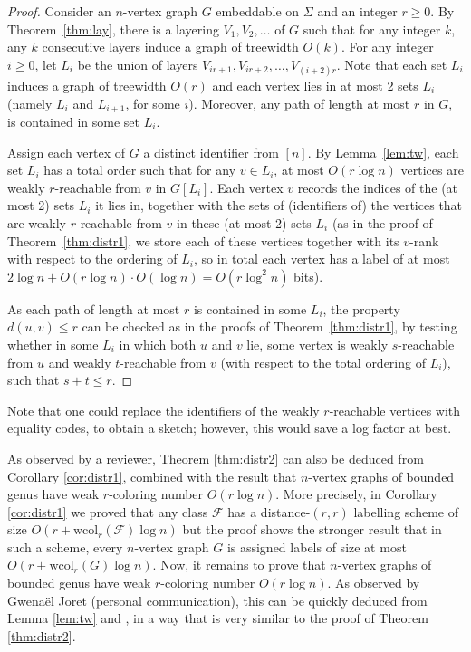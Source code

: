 \documentclass[11pt]{article}
\theoremstyle{definition}
\newcommand{\wcol}{\mathrm{wcol}}
\renewcommand{\le}{\leqslant}
\renewcommand{\ge}{\geqslant}
\begin{document}
\begin{proof}
Consider an $n$-vertex graph $G$ embeddable on $\Sigma$ and an integer
$r\ge0$. By Theorem~\ref{thm:lay}, there is a layering  $V_1, V_2,
\ldots$ of $G$ such that for any integer $k$, any $k$ consecutive
layers induce a graph of treewidth  $O(k)$. For any integer $i\ge 0$, let
$L_i$ be the union of layers $V_{ir+1}, V_{ir+2}, \ldots,
V_{(i+2)r}$. Note that each set $L_i$ induces a graph of
treewidth $O(r)$ and each vertex lies in at most 2 sets $L_i$
(namely $L_i$ and $L_{i+1}$, for some $i$). Moreover, any path  of
length at most $r$ in $G$, is contained in some set $L_i$.

Assign each vertex of $G$ a distinct identifier from $[n]$.
By Lemma~\ref{lem:tw}, each set $L_i$ has a total order such that for
any $v\in L_i$,  at
most $O(r \log n)$ vertices are weakly $r$-reachable from $v$ in
$G[L_i]$. 
Each vertex $v$ records the indices of the (at most 2) sets $L_i$ it
lies in, together with the sets of (identifiers of) the vertices that are weakly
$r$-reachable from $v$ in these (at most 2) sets $L_i$ (as in the
proof of Theorem~\ref{thm:distr1}, we store each
of these vertices together with its $v$-rank with respect to the
ordering of $L_i$, so in total each vertex has a label of at most
$2\log n+O(r \log n)\cdot O(\log n)=O(r\log^2 n)$ bits).

As each path of length at most $r$ is contained in some $L_i$, the
property $d(u,v)\le r$ can be checked as in the proofs of
Theorem~\ref{thm:distr1}, by testing whether in
some $L_i$ in which both $u$ and $v$ lie, some vertex is weakly
$s$-reachable from $u$ and weakly $t$-reachable from $v$ (with respect
to the total ordering of $L_i$), such that $s+t\le r$.
\end{proof}

\noindent
Note that one could replace the identifiers of the weakly $r$-reachable vertices with equality
codes, to obtain a sketch; however, this would save a log factor at
best.

\noindent
As observed by a reviewer, Theorem \ref{thm:distr2} can also be
deduced from Corollary \ref{cor:distr1}, combined with the result that
$n$-vertex graphs of bounded genus have weak $r$-coloring number $O(r
\log n)$. More precisely, in Corollary \ref{cor:distr1} we proved that
any class $\mathcal{F}$ has a distance-$(r,r)$ labelling scheme of
size $O(r+\wcol_r(\mathcal{F})\log n)$ but the proof shows the
stronger result that in such a scheme, every $n$-vertex graph $G$ is assigned
labels of size at most $O(r+\wcol_r(G)\log n)$. Now, it remains to prove
that $n$-vertex graphs of bounded genus have weak $r$-coloring number $O(r
\log n)$. As observed by Gwena\"el Joret (personal communication),
this can be quickly deduced from Lemma \ref{lem:tw} and
\cite[Theorem 20]{DJMMUW20}, in a way that is very similar to the
proof of Theorem \ref{thm:distr2}.
\end{document}
